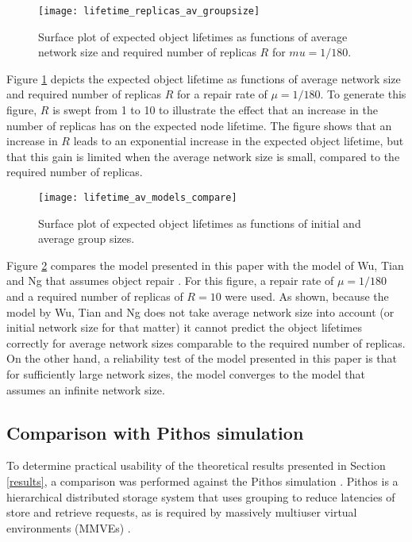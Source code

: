 \begin{figure}[htbp]
 \centering
 \texttt{[image: lifetime\_replicas\_av\_groupsize]}
 \caption{Surface plot of expected object lifetimes as functions of average network size and required number of replicas $R$ for $mu = 1/180$.}
 \label{fig_lifetime_average_vs_replicas}
\end{figure}
%
Figure \ref{fig_lifetime_average_vs_replicas} depicts the expected object lifetime as functions of average network size and required number of replicas $R$ for a repair rate of $\mu = 1/180$. To generate this figure, $R$ is swept from 1 to 10 to illustrate the effect that an increase in the number of replicas has on the expected node lifetime. The figure shows that an increase in $R$ leads to an exponential increase in the expected object lifetime, but that this gain is limited when the average network size is small, compared to the required number of replicas.

\begin{figure}[htbp]
 \centering
 \texttt{[image: lifetime\_av\_models\_compare]}
 \caption{Surface plot of expected object lifetimes as functions of initial and average group sizes.}
 \label{fig_lifetime_vs_other_model}
\end{figure}

Figure \ref{fig_lifetime_vs_other_model} compares the model presented in this paper with the model of Wu, Tian and Ng that assumes object repair \cite{replication_article}. For this figure, a repair rate of $\mu = 1/180$ and a required number of replicas of $R = 10$ were used. As shown, because the model by Wu, Tian and Ng does not take average network size into account (or initial network size for that matter) it cannot predict the object lifetimes correctly for average network sizes comparable to the required number of replicas. On the other hand, a reliability test of the model presented in this paper is that for sufficiently large network sizes, the model converges to the model that assumes an infinite network size.

\subsection{Comparison with Pithos simulation}
\label{simulation}

To determine practical usability of the theoretical results presented in Section \ref{results}, a comparison was performed against the Pithos simulation \cite{Pithos_mmve_2011}. Pithos is a hierarchical distributed storage system that uses grouping to reduce latencies of store and retrieve requests, as is required by massively multiuser virtual environments (MMVEs) \cite{gilmore_p2p_mmog_state_persistency}.

